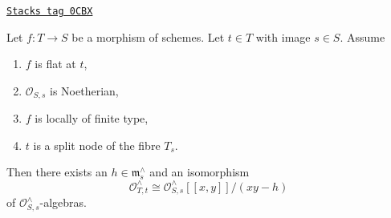 \begin{lemma}
\label{curves-lemma-formal-local-structure-nodal-family}
\href{https://stacks.math.columbia.edu/tag/0CBX}{\texttt{Stacks tag 0CBX}}

Let $f : T \to S$ be a morphism of schemes. Let $t \in T$
with image $s \in S$. Assume
\begin{enumerate}
\item $f$ is flat at $t$,
\item $\mathcal{O}_{S, s}$ is Noetherian,
\item $f$ is locally of finite type,
\item $t$ is a split node of the fibre $T_s$.
\end{enumerate}
Then there exists an $h \in \mathfrak m_s^\wedge$ and an isomorphism
$$
\mathcal{O}_{T, t}^\wedge \cong
\mathcal{O}_{S, s}^\wedge[[x, y]]/(xy - h)
$$
of $\mathcal{O}_{S, s}^\wedge$-algebras.
\end{lemma}

